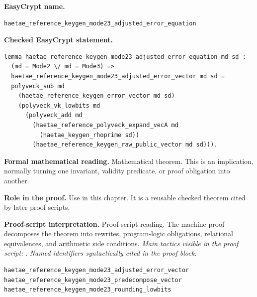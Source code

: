 \begin{formaltheorem}
\noindent\textbf{EasyCrypt name.}
\begin{lstlisting}[language=EasyCrypt,basicstyle=\ttfamily\scriptsize]
haetae_reference_keygen_mode23_adjusted_error_equation
\end{lstlisting}
\noindent\textbf{Checked EasyCrypt statement.}
\begin{lstlisting}[language=EasyCrypt,basicstyle=\ttfamily\scriptsize]
lemma haetae_reference_keygen_mode23_adjusted_error_equation md sd :
  (md = Mode2 \/ md = Mode3) =>
  haetae_reference_keygen_mode23_adjusted_error_vector md sd =
  polyveck_sub md
    (haetae_reference_keygen_error_vector md sd)
    (polyveck_vk_lowbits md
      (polyveck_add md
        (haetae_reference_polyveck_expand_vecA md
          (haetae_keygen_rhoprime sd))
        (haetae_reference_keygen_raw_public_vector md sd))).
\end{lstlisting}
\noindent\textbf{Formal mathematical reading.}
Mathematical theorem. This is an implication, normally turning one invariant, validity predicate, or proof obligation into another.

\noindent\textbf{Role in the proof.}
Use in this chapter. It is a reusable checked theorem cited by later proof scripts.

\noindent\textbf{Proof-script interpretation.}
Proof-script reading. The machine proof decomposes the theorem into rewrites, program-logic obligations, relational equivalences, and arithmetic side conditions.
\emph{Main tactics visible in the proof script:} .
\emph{Named identifiers syntactically cited in the proof block:}
\begin{lstlisting}[language=EasyCrypt,basicstyle=\ttfamily\scriptsize]
haetae_reference_keygen_mode23_adjusted_error_vector
haetae_reference_keygen_mode23_predecompose_vector
haetae_reference_keygen_mode23_rounding_lowbits
\end{lstlisting}

\end{formaltheorem}

